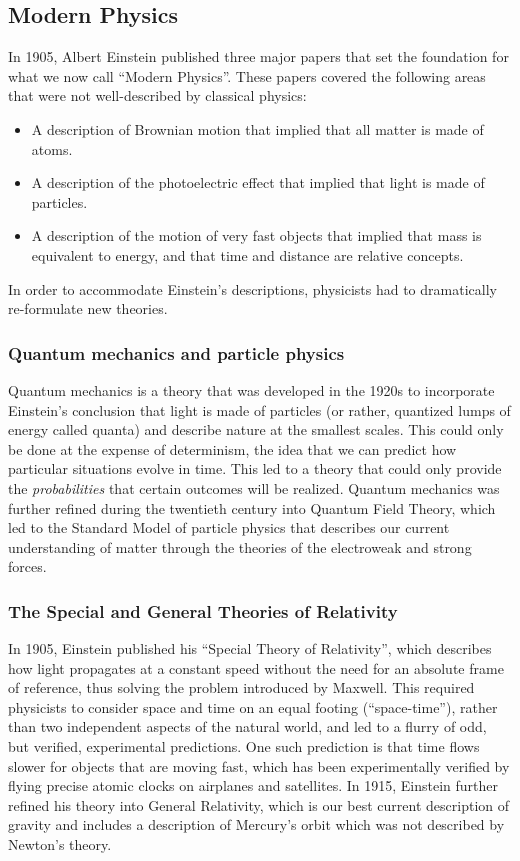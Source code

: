 \subsection{Modern Physics}
In 1905, Albert Einstein published three major papers that set the foundation for what we now call ``Modern Physics''. These papers covered the following areas that were not well-described by classical physics:
\begin{itemize}
\item A description of Brownian motion that implied that all matter is made of atoms.
\item A description of the photoelectric effect that implied that light is made of particles.
\item A description of the motion of very fast objects that implied that mass is equivalent to energy, and that time and distance are relative concepts.
\end{itemize}
In order to accommodate Einstein's descriptions, physicists had to dramatically re-formulate new theories. 

\subsubsection{Quantum mechanics and particle physics}
Quantum mechanics is a theory that was developed in the 1920s to incorporate Einstein's conclusion that light is made of particles (or rather, quantized lumps of energy called quanta) and describe nature at the smallest scales. This could only be done at the expense of determinism, the idea that we can predict how particular situations evolve in time. This led to a theory that could only provide the \textit{probabilities} that certain outcomes will be realized. Quantum mechanics was further refined during the twentieth century into Quantum Field Theory, which led to the Standard Model of particle physics that describes our current understanding of matter through the theories of the electroweak and strong forces.

\subsubsection{The Special and General Theories of Relativity}
In 1905, Einstein published his ``Special Theory of Relativity'', which describes how light propagates at a constant speed without the need for an absolute frame of reference, thus solving the problem introduced by Maxwell. This required physicists to consider space and time on an equal footing (``space-time''), rather than two independent aspects of the natural world, and led to a flurry of odd, but verified, experimental predictions. One such prediction is that time flows slower for objects that are moving fast, which has been experimentally verified by flying precise atomic clocks on airplanes and satellites. In 1915, Einstein further refined his theory into General Relativity, which is our best current description of gravity and includes a description of Mercury's orbit which was not described by Newton's theory.

